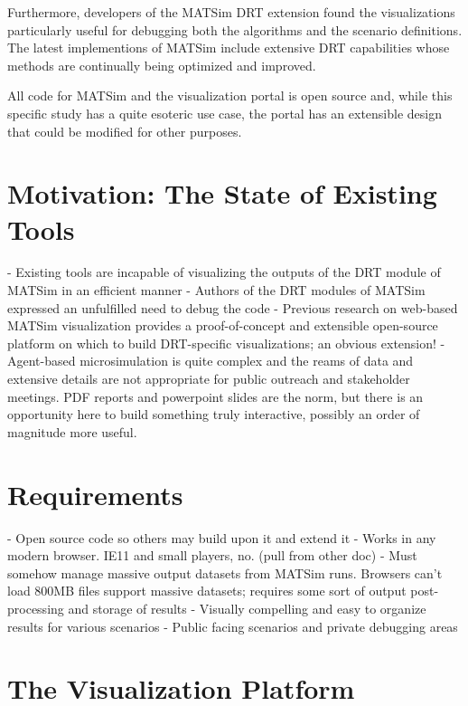 \documentclass[3p,times,procedia]{elsarticle}
\begin{document}
Furthermore, developers of the MATSim DRT extension found the visualizations particularly useful for debugging both the algorithms and the scenario definitions. The latest implementions of MATSim include extensive DRT capabilities whose methods are continually being optimized and improved.

All code for MATSim and the visualization portal is open source and, while this specific study has a quite esoteric use case, the portal has an extensible design that could be modified for other purposes.

\section{Motivation: The State of Existing Tools}
\label{motivation}

- Existing tools are incapable of visualizing the outputs of the DRT module of MATSim in an efficient manner
- Authors of the DRT modules of MATSim expressed an unfulfilled need to debug the code
- Previous research on web-based MATSim visualization provides a proof-of-concept and extensible open-source platform on which to build DRT-specific visualizations; an obvious extension!
- Agent-based microsimulation is quite complex and the reams of data and extensive details are not appropriate for public outreach and stakeholder meetings. PDF reports and powerpoint slides are the norm, but there is an opportunity here to build something truly interactive, possibly an order of magnitude more useful.

\section{Requirements}
\label{requirements}

- Open source code so others may build upon it and extend it
- Works in any modern browser. IE11 and small players, no. (pull from other doc)
- Must somehow manage massive output datasets from MATSim runs. Browsers can't load 800MB files support massive datasets; requires some sort of output post-processing and storage of results
- Visually compelling and easy to organize results for various scenarios
- Public facing scenarios and private debugging areas


\section{The Visualization Platform}
\label{platform}
\end{document}
